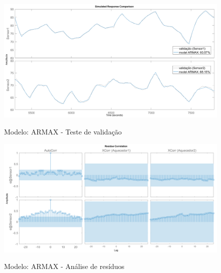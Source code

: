 \begin{apendicesenv}
\begin{figure}
	\caption{Modelo: ARMAX - Teste de validação}
	\begin{center}
		\includegraphics[width=1.00\textwidth]{./5_images/tclabsp-models-ARMAX-compare.png} 
		\label{fig:tclabsp-models-armax-compare}
	\end{center}
	\centering
\end{figure}

\begin{figure}
	\caption{Modelo: ARMAX - Análise de resíduos}
	\begin{center}
		\includegraphics[width=1.00\textwidth]{./5_images/tclabsp-models-ARMAX-resid.png} 
		\label{fig:tclabsp-models-armax-resid}
	\end{center}
	\centering
\end{figure}


\end{apendicesenv}

